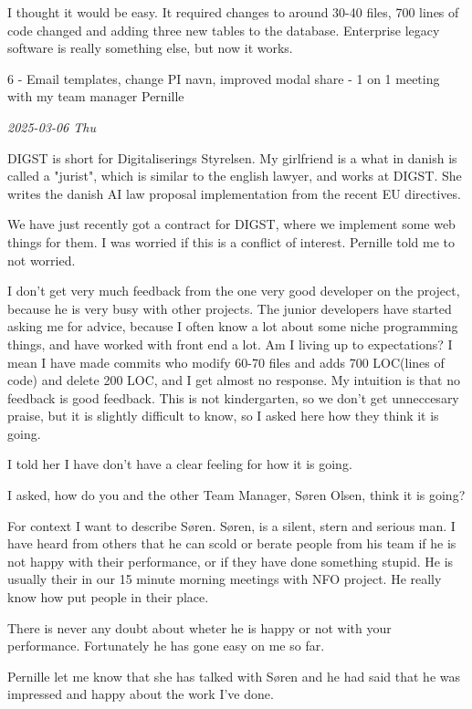 \documentclass[../main.tex]{subfiles}
\begin{document}
I thought it would be easy. It required changes to around 30-40 files, 700 lines of code changed and adding three new tables to the database. Enterprise legacy software is really something else, but now it
works. 

6 - Email templates, change PI navn, improved modal share - 1 on 1
meeting with my team manager Pernille

\textit{2025-03-06 Thu}

DIGST is short for Digitaliserings Styrelsen. My girlfriend is a what in danish is called a "jurist", which is similar to the english lawyer, and works at DIGST. She writes the danish AI law proposal implementation from the recent EU directives.

We have just recently got a contract for DIGST, where we implement some web things for them. I was worried if this is a conflict of interest. Pernille told me to not worried.

I don't get very much feedback from the one very good developer on the project, because he is very busy with other projects. The junior developers have started asking me for advice, because I often know a lot about some niche programming things, and have worked with front end a lot. Am I living up to expectations? I mean I have made commits who modify 60-70 files and adds 700 LOC(lines of code) and delete 200 LOC, and I get almost no response. My intuition is that no feedback is good feedback. This is not kindergarten, so we don't get unneccesary praise, but it is slightly difficult to know, so I asked here how they think it is going.

I told her I have don't have a clear feeling for how it is going.

I asked, how do you and the other Team Manager, Søren Olsen, think it is going?

For context I want to describe Søren. Søren, is a silent, stern and serious man. I have heard from others that he can scold or berate people from his team if he is not happy with their performance, or if they have done something stupid. He is usually their in our 15 minute morning meetings with NFO project. He really know how put people in their place.

There is never any doubt about wheter he is happy or not with your performance. Fortunately he has gone easy on me so far.

Pernille let me know that she has talked with Søren and he had said that he was impressed and happy about the work I've
done.
\end{document}
